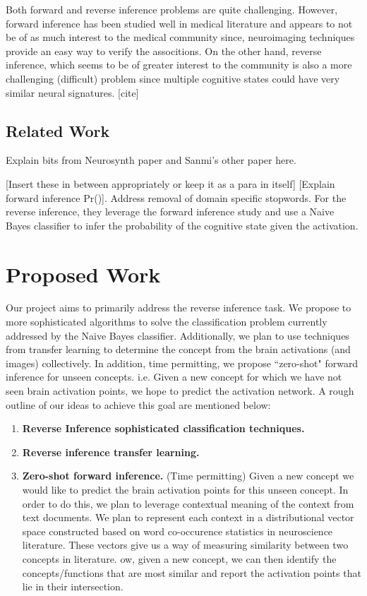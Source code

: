\documentclass[11pt]{article}
\begin{document}
Both forward and reverse inference problems are quite challenging. However, forward inference has been studied well in medical literature and appears to not be of as much interest to the medical community since, neuroimaging techniques provide an easy way to verify the associtions. On the other hand, reverse inference, which seems to be of greater interest to the community is also a more challenging (difficult) problem since multiple cognitive states could have very similar neural signatures. [cite]

\subsection{Related Work}
Explain bits from Neurosynth paper and Sanmi's other paper here.

[Insert these in between appropriately or keep it as a para in itself]
[Explain forward inference Pr()]. Address removal of domain specific stopwords. For the reverse inference, they leverage the forward inference study and use a Naive Bayes classifier to infer the probability of the cognitive state given the activation. 

\section{Proposed Work}

Our project aims to primarily address the reverse inference task. We propose to more sophisticated algorithms to solve the classification problem currently addressed by the Naive Bayes classifier. Additionally, we plan to use techniques from transfer learning to determine the concept from the brain activations (and images) collectively. In addition, time permitting, we propose ``zero-shot" forward inference for unseen concepts. i.e. Given a new concept for which we have not seen brain activation points, we hope to predict the activation network. A rough outline of our ideas to achieve this goal are mentioned below:

\begin{enumerate}

    \item {\bf Reverse Inference sophisticated classification techniques.}

    \item {\bf Reverse inference transfer learning.}

    \item {\bf Zero-shot forward inference.}
 (Time permitting)  Given a new concept we would like to predict the brain activation points for this unseen concept. In order to do this, we plan to leverage contextual meaning of the context from text documents. We plan to represent each context in a distributional vector space constructed based on word co-occurence statistics in neuroscience literature. These vectors give us a way of measuring similarity between two concepts in literature. ow, given a new concept, we can then identify the concepts/functions that are most similar and report the activation points that lie in their intersection.

\end{enumerate}
\end{document}
